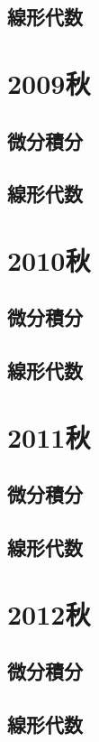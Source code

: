 \subsection{線形代数}

\section{2009秋}
\subsection{微分積分}


\subsection{線形代数}

\section{2010秋}
\subsection{微分積分}


\subsection{線形代数}

\section{2011秋}
\subsection{微分積分}


\subsection{線形代数}

\section{2012秋}
\subsection{微分積分}


\subsection{線形代数}

